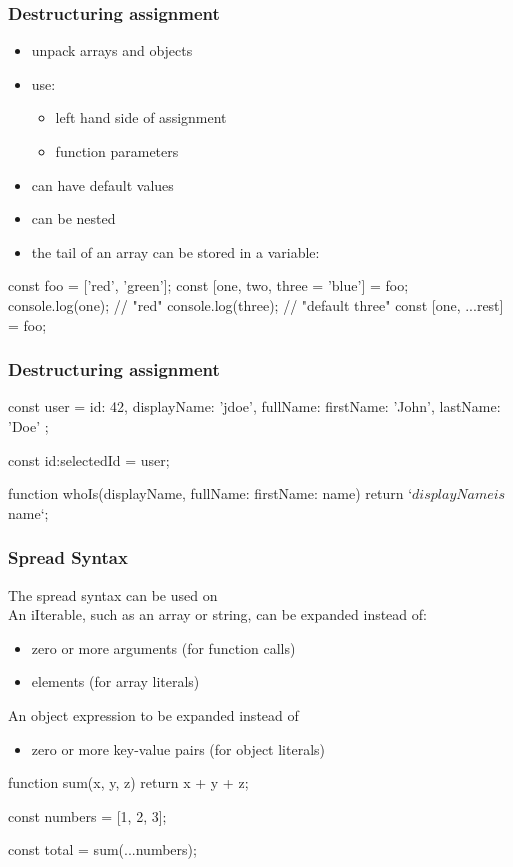 \begin{frame}[fragile] \frametitle{Destructuring assignment}
\begin{itemize}
  \item unpack arrays and objects
  \item use:
  \begin{itemize}
    \item left hand side of assignment
    \item function parameters
  \end{itemize}
  \item can have default values
  \item can be nested
  \item the tail of an array can be stored in a variable: 
\end{itemize}
\begin{CodeBox}{}
const foo = ['red', 'green'];
const [one, two, three = 'blue'] = foo;
console.log(one); // "red"
console.log(three); // "default three"
const [one, ...rest] = foo;
\end{CodeBox}
\end{frame}

\begin{frame}[fragile] \frametitle{Destructuring assignment}
\begin{CodeBox}{}
const user = {
  id: 42,
  displayName: 'jdoe',
  fullName: {
    firstName: 'John',
    lastName: 'Doe'
  }
};

const {id:selectedId} = user;

function whoIs({displayName, fullName: {firstName: name}}) {
  return `${displayName} is ${name}`;
}
\end{CodeBox}
\end{frame}

\begin{frame}[fragile] \frametitle{Spread Syntax}
The spread syntax  can be used on \\
An iIterable, such as an array or string, can be expanded instead of:
\begin{itemize}
  \item zero or more arguments (for function calls)
  \item elements (for array literals)
\end{itemize}

An object expression to be expanded instead of
\begin{itemize}
  \item  zero or more key-value pairs (for object literals)
\end{itemize}

\begin{CodeBox}{}
function sum(x, y, z) {
  return x + y + z;
}

const numbers = [1, 2, 3];

const total = sum(...numbers);
\end{CodeBox}
\end{frame}

